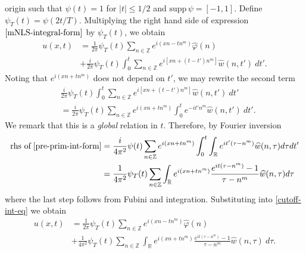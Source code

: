 \documentclass[12pt,reqno]{amsart}
\numberwithin{equation}{section}  %
\numberwithin{figure}{section}
\newcommand{\rr}{\mathbb{R}}
\newcommand{\zz}{\mathbb{Z}}
\newcommand{\wh}{\widehat}
\newcommand{\vp}{\varphi}
\theoremstyle{plain}
\theoremstyle{definition}
\theoremstyle{remark}
\begin{document}
origin such that $\psi(t) = 1$ for $|t| \le 1/2$ and $\text{supp} \, \psi 
= [-1, 1 ]$. Define $\psi_{T}(t) = \psi(2t/T)$.  Multiplying the right hand side of expression
$\eqref{mNLS-integral-form}$ by $\psi_{T}(t)$, we obtain
%
%
\begin{equation}
	\begin{split}
		\label{cutoff-int-eq}
		u(x, t)
		& = \frac{1}{2 \pi} \psi_{T}(t) \sum_{n \in \zz} e^{i(xn - t n^{m })} \widehat{\vp}(n) 
		\\
		& + \frac{i }{2 \pi} \psi_{T}(t) \int_0^t \sum_{n \in \zz} 
		e^{i\left[ xn + (t - t')n^m \right]} \wh{w}(n, t') \ dt'.
	\end{split}
\end{equation}
%
%
Noting that $e^{i\left( xn + tn^{m } \right)}$ 
does not depend on $t'$, we may rewrite the second term
%
%
\begin{equation}
	\label{pre-prim-int-form}
	\begin{split}
		& \frac{i }{2 \pi} \psi_{T}(t) \int_0^t \sum_{n \in \zz} 
		e^{i\left[ xn + (t - t') n^m \right]} \wh{w}(n, t') \ dt'
		\\
		& = \frac{i}{2 \pi} \psi_{T}(t) \sum_{n \in \zz} e^{i\left( xn + t 
		 n^{m } 
		\right)} \int_0^t e^{- it'n^{m }} \wh{w}(n, t') \ dt'.
	\end{split}
\end{equation}
We remark that this is a \emph{global} relation in $t$. Therefore, by Fourier 
inversion
%
%
%
%
%
%
%
\begin{equation*}
	\begin{split}
		\text{rhs of} \; \eqref{pre-prim-int-form}
		& = \frac{i}{4 \pi^2} \psi (t) \sum_{n \in \zz} e^{i\left( xn + t 
		 n^m
		\right)} \int_0^t \int_\rr e^{it'\left( \tau - n^m \right) }
		\wh{w}(n, \tau) d \tau dt'
		\\
		& = \frac{1}{4 \pi^2} \psi_{T}(t) \sum_{n \in \zz} \int_\rr 
		e^{i\left( xn + tn^m \right)} \frac{e^{it\left( \tau - n^m 
		\right)}-1}{\tau - n^m} \wh{w}(n, \tau) d \tau
	\end{split}
\end{equation*}
%
%
where the last step follows from Fubini and integration. Substituting
into \eqref{cutoff-int-eq} we obtain
%
%
\begin{equation}
	\begin{split}
		\label{cutoff-int-eq-2}
		u(x, t)
		& = \frac{1}{2 \pi} \psi_{T}(t) \sum_{n \in \zz} e^{i(xn - tn^{m })} \widehat{\vp}(n) 
		\\
		& + \frac{1}{4 \pi^2} \psi_{T}(t) \sum_{n \in \zz} \int_\rr
		e^{i(xn + t n^m)} \frac{e^{it(\tau - n^m)}- 1}{\tau - n^m} 
		\wh{w}(n, \tau) \ d \tau.
	\end{split}
\end{equation}
\end{document}
